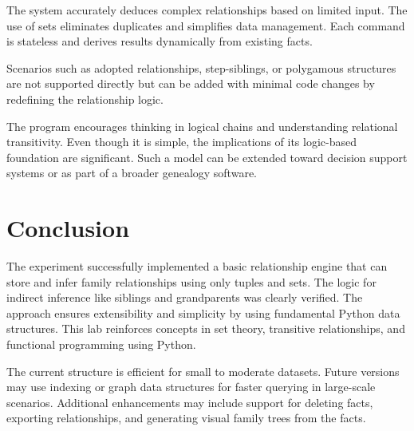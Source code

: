 \documentclass[a4paper, journal]{IEEEtran}
\begin{document}
The system accurately deduces complex relationships based on limited input. The use of sets eliminates duplicates and simplifies data management. Each command is stateless and derives results dynamically from existing facts.

Scenarios such as adopted relationships, step-siblings, or polygamous structures are not supported directly but can be added with minimal code changes by redefining the relationship logic.

The program encourages thinking in logical chains and understanding relational transitivity. Even though it is simple, the implications of its logic-based foundation are significant. Such a model can be extended toward decision support systems or as part of a broader genealogy software.

\section{Conclusion}

The experiment successfully implemented a basic relationship engine that can store and infer family relationships using only tuples and sets. The logic for indirect inference like siblings and grandparents was clearly verified. The approach ensures extensibility and simplicity by using fundamental Python data structures. This lab reinforces concepts in set theory, transitive relationships, and functional programming using Python.

The current structure is efficient for small to moderate datasets. Future versions may use indexing or graph data structures for faster querying in large-scale scenarios. Additional enhancements may include support for deleting facts, exporting relationships, and generating visual family trees from the facts.



\end{document}
